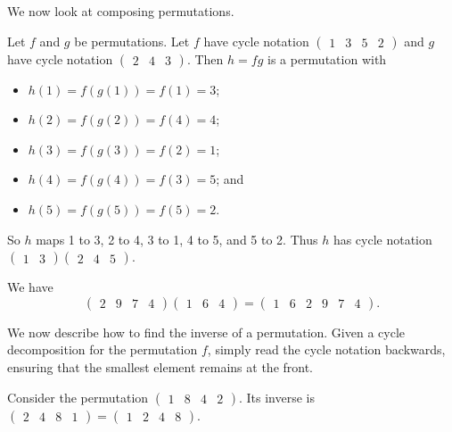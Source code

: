 We now look at composing permutations.
\begin{example}
    Let $f$ and $g$ be permutations. Let $f$ have cycle notation $\begin{pmatrix}1 & 3 & 5 & 2\end{pmatrix}$ and $g$ have cycle notation $\begin{pmatrix}2 & 4 & 3\end{pmatrix}$. Then $h = fg$ is a permutation with
    \begin{itemize}
        \item $h(1) = f(g(1)) = f(1) = 3$;
        \item $h(2) = f(g(2)) = f(4) = 4$;
        \item $h(3) = f(g(3)) = f(2) = 1$;
        \item $h(4) = f(g(4)) = f(3) = 5$; and
        \item $h(5) = f(g(5)) = f(5) = 2$.
    \end{itemize}

    So $h$ maps 1 to 3, 2 to 4, 3 to 1, 4 to 5, and 5 to 2. Thus $h$ has cycle notation $\begin{pmatrix}1 & 3\end{pmatrix}\begin{pmatrix}2 & 4 & 5\end{pmatrix}$.
\end{example}

\begin{example}
    We have
    \[\begin{pmatrix}2 & 9 & 7 & 4\end{pmatrix}\begin{pmatrix}1 & 6 & 4\end{pmatrix} = \begin{pmatrix}1 & 6 & 2 & 9 & 7 & 4\end{pmatrix}.\]
\end{example}

We now describe how to find the inverse of a permutation. Given a cycle decomposition for the permutation $f$, simply read the cycle notation backwards, ensuring that the smallest element remains at the front.

\begin{example}
    Consider the permutation $\begin{pmatrix}1 & 8 & 4 & 2\end{pmatrix}$. Its inverse is $\begin{pmatrix}2 & 4 & 8 & 1\end{pmatrix} = \begin{pmatrix}1 & 2 & 4 & 8\end{pmatrix}$.
\end{example}

